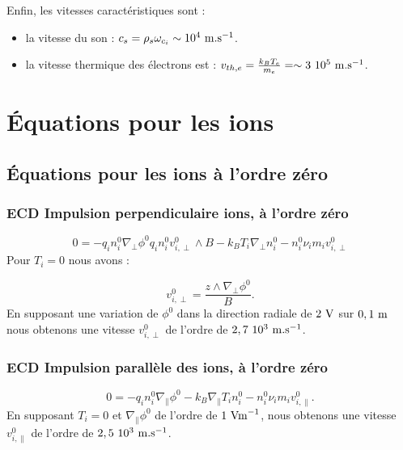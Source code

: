\documentclass{book}
\begin{document}
Enfin, les vitesses caract\'eristiques sont :
\begin{itemize}
\item la vitesse du son : $c_s=\rho_s\omega_{c_i}\sim 10^4 \ {\rm
m.s}^{-1}$.
\item la vitesse thermique des \'electrons est :
$v_{th,e}=\frac{k_B T_e}{m_e}=\sim 3\ 10^{5} \ {\rm m.s}^{-1}$.
\end{itemize}


\section{\'Equations pour les  ions}
\subsection{\'Equations pour les ions \`a l'ordre z\'ero}
\subsubsection{ECD Impulsion perpendiculaire ions, \`a l'ordre z\'ero}

\begin{equation}
0=-q_i n_i^0\nabla_\perp\phi^0q_i n_i^0v_{i,\perp}^0\wedge B 
-k_B T_i\nabla_\perp n_i^0
-n_i^0\nu_i m_i v_{i,\perp}^0
\end{equation}
Pour $T_i=0$ nous avons :

\begin{equation}
v_{i,\perp}^0=\frac{z\wedge \nabla_\perp\phi^0}{B}.
\end{equation}
En supposant une variation de $\phi^0$ dans la direction radiale de
$2\ {\rm V}$ sur $0,1\ {\rm m}$ nous obtenons une vitesse
$v_{i,\perp}^0$ de l'ordre 
de $2,7\ 10^3\ {\rm m.s}^{-1}$.

\subsubsection{ECD Impulsion parall\`ele des ions, \`a l'ordre z\'ero}

\begin{equation}
0=-q_i n_i^0\nabla_\parallel\phi^0
-k_B\nabla_\parallel T_i n_i^0
-n_i^0\nu_i m_i v_{i,\parallel}^0.
\end{equation}
En supposant $T_i=0$ et $\nabla_\parallel\phi^0$ de l'ordre de $1 \ {\rm
Vm}^{-1}$, nous obtenons une vitesse $v_{i,\parallel}^0$ de l'ordre de
$2,5\ 10^3\ {\rm m.s}^{-1}$.
\end{document}
